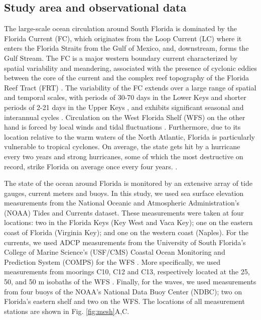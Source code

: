 \documentclass[preprint,12pt,authoryear]{elsarticle}
\begin{document}
\subsection{Study area and observational data}
The large-scale ocean circulation around South Florida is dominated by the Florida Current (FC), which originates from the Loop Current (LC) where it enters the Florida Straits from the Gulf of Mexico, and, downstream, forms the Gulf Stream. The FC is a major western boundary current characterized by spatial variability and meandering, associated with the presence of cyclonic eddies between the core of the current and the complex reef topography of the Florida Reef Tract (FRT) \citep{lee1995florida,kourafalou2012florida}.
The variability of the FC extends over a large range of spatial and temporal scales, with periods of 30-70 days in the Lower Keys \citep{lee1995florida} and shorter periods of 2-21 days in the Upper Keys \citep{lee1977low}, and exhibits significant seasonal and interannual cycles \citep{johns1987meandering, lee1988wind,schott1988variability}. Circulation on the West Florida Shelf (WFS) on the other hand is forced by local winds and tidal fluctuations \citep{lee2002volume,liu2012seasonal}. Furthermore, due to its location relative to the warm waters of the North Atlantic, Florida is particularly vulnerable to tropical cyclones. On average, the state gets hit by a hurricane every two years and strong hurricanes, some of which the most destructive on record, strike Florida on average once every four years. \cite{malmstadt2009florida}.

The state of the ocean around Florida is monitored by an extensive array of tide gauges, current meters and buoys. In this study, we used sea surface elevation measurements from the National Oceanic and Atmospheric Administration’s (NOAA) Tides and Currents dataset. These measurements were taken at four locations: two in the Florida Keys (Key West and Vaca Key); one on the eastern coast of Florida (Virginia Key); and one on the western coast (Naples). For the currents, we used ADCP measurements from the University of South Florida's College of Marine Science's (USF/CMS) Coastal Ocean Monitoring and Prediction System (COMPS) for the WFS \citep{weisberg2009mean}. More specifically, we used measurements from moorings C10, C12 and C13, respectively located at the 25, 50, and 50 m isobaths of the WFS \citep{liu2020impacts}. Finally, for the waves, we used measurements from four buoys of the NOAA's National Data Buoy Center (NDBC); two on Florida's eastern shelf and two on the WFS. The locations of all measurement stations are shown in Fig. \ref{fig:mesh}A,C.
\end{document}
